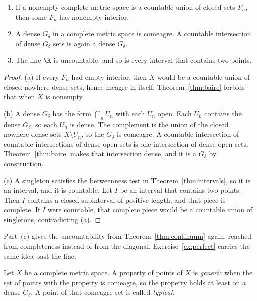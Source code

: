 \begin{corollary}\label{cor:bairecor}
\begin{enumerate}[label=(\alph*)]
\item If a nonempty complete metric space is a countable union of closed sets $F_n$, then some $F_n$ has nonempty interior.
\item A dense $G_\delta$ in a complete metric space is comeagre. A countable intersection of dense $G_\delta$ sets is again a dense $G_\delta$.
\item The line $\R$ is uncountable, and so is every interval that contains two points.
\end{enumerate}
\end{corollary}
\begin{proof}
(a) If every $F_n$ had empty interior, then $X$ would be a countable union of closed nowhere dense sets, hence meagre in itself. Theorem~\ref{thm:baire} forbids that when $X$ is nonempty.

(b) A dense $G_\delta$ has the form $\bigcap_n U_n$ with each $U_n$ open. Each $U_n$ contains the dense $G_\delta$, so each $U_n$ is dense. The complement is the union of the closed nowhere dense sets $X\setminus U_n$, so the $G_\delta$ is comeagre. A countable intersection of countable intersections of dense open sets is one intersection of dense open sets. Theorem~\ref{thm:baire} makes that intersection dense, and it is a $G_\delta$ by construction.

(c) A singleton satisfies the betweenness test in Theorem~\ref{thm:intervals}, so it is an interval, and it is countable. Let $I$ be an interval that contains two points. Then $I$ contains a closed subinterval of positive length, and that piece is complete. If $I$ were countable, that complete piece would be a countable union of singletons, contradicting (a).
\end{proof}

Part~(c) gives the uncountability from Theorem~\ref{thm:continuum} again, reached from completeness instead of from the diagonal. Exercise~\ref{ex:perfect} carries the same idea past the line.

\begin{definition}
Let $X$ be a complete metric space. A property of points of $X$ is \emph{generic} when the set of points with the property is comeagre, so the property holds at least on a dense $G_\delta$. A point of that comeagre set is called \emph{typical}.
\end{definition}

